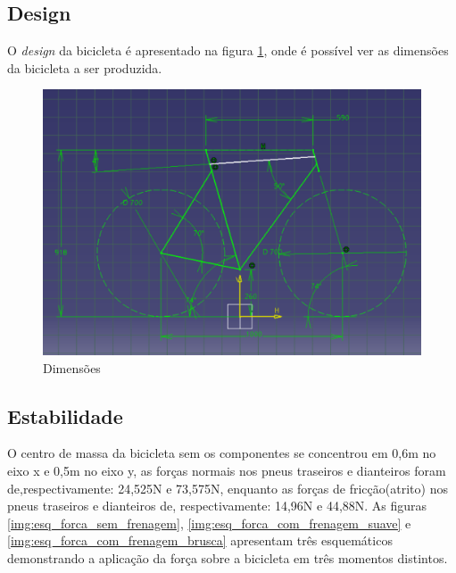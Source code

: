	\subsection{Design}

	O \textit{design} da bicicleta é apresentado na figura \ref{img:dimensoes}, onde é possível ver as dimensões da bicicleta a ser produzida.	
	
	\graphicspath{{figuras/}}
	\begin{figure}[h!]
	\centering
	\includegraphics[scale=0.80]{dimensoes.png}
	\caption{Dimensões}
	\label{img:dimensoes}
	\end{figure}


	\subsection{Estabilidade}
	O centro de massa da bicicleta sem os componentes se concentrou em 0,6m no eixo x e 0,5m no eixo y, as forças normais nos pneus traseiros e dianteiros foram de,respectivamente: 24,525N e 73,575N, enquanto as forças de fricção(atrito)  nos pneus traseiros e dianteiros de, respectivamente: 14,96N e 44,88N. As figuras \ref{img:esq_forca_sem_frenagem}, \ref{img:esq_forca_com_frenagem_suave} e \ref{img:esq_forca_com_frenagem_brusca} apresentam três esquemáticos demonstrando a aplicação da força sobre a bicicleta em três momentos distintos.

